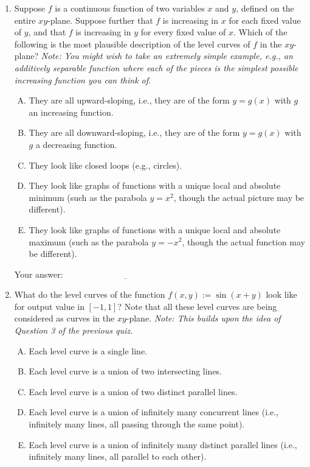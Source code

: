 \documentclass[10pt]{amsart}
\begin{document}
\begin{enumerate}
\item Suppose $f$ is a continuous function of two variables $x$ and
  $y$, defined on the entire $xy$-plane. Suppose further that $f$ is
  increasing in $x$ for each fixed value of $y$, and that $f$ is
  increasing in $y$ for every fixed value of $x$. Which of the
  following is the most plausible description of the level curves of
  $f$ in the $xy$-plane? {\em Note: You might wish to take an
  extremely simple example, e.g., an additively separable function
  where each of the pieces is the simplest possible increasing
  function you can think of}.

  \begin{enumerate}[(A)]
  \item They are all upward-sloping, i.e., they are of the form $y =
    g(x)$ with $g$ an increasing function.
    \item They are all downward-sloping, i.e., they are of the form $y
      = g(x)$ with $g$ a decreasing function.
    \item They look like closed loops (e.g., circles).
    \item They look like graphs of functions with a unique local and
      absolute minimum (such as the parabola $y = x^2$, though the
      actual picture may be different).
    \item They look like graphs of functions with a unique local and
      absolute maximum (such as the parabola $y = -x^2$, though the
      actual function may be different).
  \end{enumerate}

  \vspace{0.1in}
  Your answer: $\underline{\qquad\qquad\qquad\qquad\qquad\qquad\qquad}$
  \vspace{0.1in}

\item What do the level curves of the function $f(x,y) := \sin(x + y)$
  look like for output value in $[-1,1]$? Note that all these level
  curves are being considered as curves in the $xy$-plane. {\em Note:
  This builds upon the idea of Question 3 of the previous quiz.}

  \begin{enumerate}[(A)]
  \item Each level curve is a single line.
  \item Each level curve is a union of two intersecting lines.
  \item Each level curve is a union of two distinct parallel lines.
  \item Each level curve is a union of infinitely many concurrent
    lines (i.e., infinitely many lines, all passing through the same
    point).
  \item Each level curve is a union of infinitely many distinct
    parallel lines (i.e., infinitely many lines, all parallel to each
    other).
  \end{enumerate}


\end{enumerate}
\end{document}

